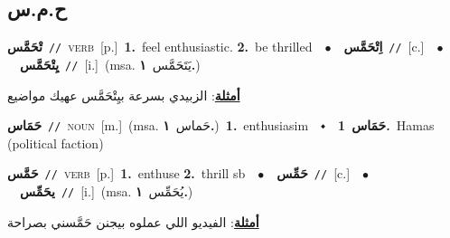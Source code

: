 \documentclass[10pt,a4paper,twoside]{article} %
\begin{document}
\begin{multicols}{2}
\vspace{-3mm}
\subsection*{\color{blue}\foreignlanguage{arabic}{ح.م.س}\color{blue}{}} 

{\setlength\topsep{0pt}\textbf{\foreignlanguage{arabic}{تْحَمَّس}}\ {\color{gray}\texttt{//}\color{black}}\ \textsc{verb}\ [p.]\ \textbf{1.}~feel enthusiastic.  \textbf{2.}~be thrilled\ \ $\bullet$\ \ \setlength\topsep{0pt}\textbf{\foreignlanguage{arabic}{اِتْحَمَّس}}\ {\color{gray}\texttt{//}\color{black}}\ [c.]\ \ $\bullet$\ \ \setlength\topsep{0pt}\textbf{\foreignlanguage{arabic}{يِتْحَمَّس}}\ {\color{gray}\texttt{//}\color{black}}\ [i.]\ \color{gray}(msa. \foreignlanguage{arabic}{يَتَحَمَّس}~\foreignlanguage{arabic}{\textbf{١.}})\color{black}\  \begin{flushright}\color{gray}\foreignlanguage{arabic}{\textbf{\underline{\foreignlanguage{arabic}{أمثلة}}}: الزبيدي بسرعة بيِتْحَمَّس عهيك مواضيع}\end{flushright}\color{black}} \vspace{2mm}

{\setlength\topsep{0pt}\textbf{\foreignlanguage{arabic}{حَمَاس}}\ {\color{gray}\texttt{//}\color{black}}\ \textsc{noun}\ [m.]\ \color{gray}(msa. \foreignlanguage{arabic}{حَماس}~\foreignlanguage{arabic}{\textbf{١.}})\color{black}\ \textbf{1.}~enthusiasim\ \ $\smblkdiamond$\ \ \setlength\topsep{0pt}\textbf{\foreignlanguage{arabic}{حَمَاس}}\ \textbf{1.}~Hamas (political faction)\ } \vspace{2mm}

{\setlength\topsep{0pt}\textbf{\foreignlanguage{arabic}{حَمَّس}}\ {\color{gray}\texttt{//}\color{black}}\ \textsc{verb}\ [p.]\ \textbf{1.}~enthuse  \textbf{2.}~thrill sb\ \ $\bullet$\ \ \setlength\topsep{0pt}\textbf{\foreignlanguage{arabic}{حَمِّس}}\ {\color{gray}\texttt{//}\color{black}}\ [c.]\ \ $\bullet$\ \ \setlength\topsep{0pt}\textbf{\foreignlanguage{arabic}{يحَمِّس}}\ {\color{gray}\texttt{//}\color{black}}\ [i.]\ \color{gray}(msa. \foreignlanguage{arabic}{يُحَمِّس}~\foreignlanguage{arabic}{\textbf{١.}})\color{black}\  \begin{flushright}\color{gray}\foreignlanguage{arabic}{\textbf{\underline{\foreignlanguage{arabic}{أمثلة}}}: الفيديو اللي عملوه بيجنن حَمَّسني بصراحة}\end{flushright}\color{black}} \vspace{2mm}


\end{multicols}
\end{document}
